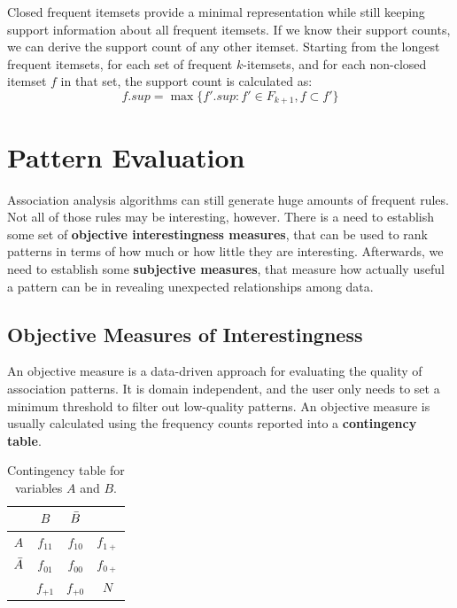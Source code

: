 

Closed frequent itemsets provide a minimal representation while still keeping support information about all frequent itemsets. If we know their support counts, we can derive the support count of any other itemset. Starting from the longest frequent itemsets, for each set of frequent $k$-itemsets, and for each non-closed itemset $f$ in that set, the support count is calculated as:
\begin{equation*}
    f.sup = \max\{f'.sup : f' \in F_{k+1}, f \subset f'\}
\end{equation*}

\section{Pattern Evaluation}

Association analysis algorithms can still generate huge amounts of frequent rules. Not all of those rules may be interesting, however. There is a need to establish some set of \textbf{objective interestingness measures}, that can be used to rank patterns in terms of how much or how little they are interesting. Afterwards, we need to establish some \textbf{subjective measures}, that measure how actually useful a pattern can be in revealing unexpected relationships among data.

\subsection{Objective Measures of Interestingness}

An objective measure is a data-driven approach for evaluating the quality of association patterns. It is domain independent, and the user only needs to set a minimum threshold to filter out low-quality patterns. An objective measure is usually calculated using the frequency counts reported into a \textbf{contingency table}.

\begin{table}[h]
    \centering
    \begin{tabular}{c|ccc}
         & $B$ & $\Bar{B}$ & \\
        \hline
        $A$ & $f_{11}$ & $f_{10}$ & $f_{1+}$\\
        $\Bar{A}$ & $f_{01} $ & $f_{00}$ & $f_{0+}$\\
        & $f_{+1}$ & $f_{+0}$ & $N$ \\
    \end{tabular}
    \caption{Contingency table for variables $A$ and $B$.}
\end{table}

